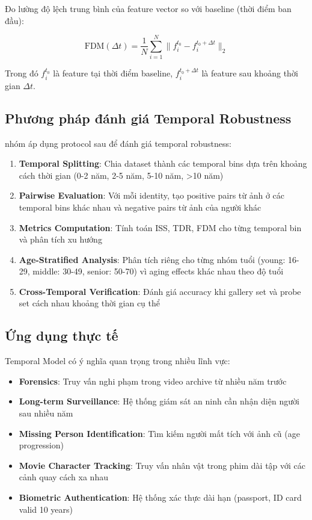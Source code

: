 Đo lường độ lệch trung bình của feature vector so với baseline (thời điểm ban đầu):

\begin{equation}
\text{FDM}(\Delta t) = \frac{1}{N} \sum_{i=1}^{N} \|f_i^{t_0} - f_i^{t_0 + \Delta t}\|_2
\end{equation}

Trong đó $f_i^{t_0}$ là feature tại thời điểm baseline, $f_i^{t_0 + \Delta t}$ là feature sau khoảng thời gian $\Delta t$.

\subsection{Phương pháp đánh giá Temporal Robustness}

nhóm áp dụng protocol sau để đánh giá temporal robustness:

\begin{enumerate}
    \item \textbf{Temporal Splitting}: Chia dataset thành các temporal bins dựa trên khoảng cách thời gian (0-2 năm, 2-5 năm, 5-10 năm, >10 năm)
    
    \item \textbf{Pairwise Evaluation}: Với mỗi identity, tạo positive pairs từ ảnh ở các temporal bins khác nhau và negative pairs từ ảnh của người khác
    
    \item \textbf{Metrics Computation}: Tính toán ISS, TDR, FDM cho từng temporal bin và phân tích xu hướng
    
    \item \textbf{Age-Stratified Analysis}: Phân tích riêng cho từng nhóm tuổi (young: 16-29, middle: 30-49, senior: 50-70) vì aging effects khác nhau theo độ tuổi
    
    \item \textbf{Cross-Temporal Verification}: Đánh giá accuracy khi gallery set và probe set cách nhau khoảng thời gian cụ thể
\end{enumerate}

\subsection{Ứng dụng thực tế}

Temporal Model có ý nghĩa quan trọng trong nhiều lĩnh vực:

\begin{itemize}
    \item \textbf{Forensics}: Truy vấn nghi phạm trong video archive từ nhiều năm trước
    \item \textbf{Long-term Surveillance}: Hệ thống giám sát an ninh cần nhận diện người sau nhiều năm
    \item \textbf{Missing Person Identification}: Tìm kiếm người mất tích với ảnh cũ (age progression)
    \item \textbf{Movie Character Tracking}: Truy vấn nhân vật trong phim dài tập với các cảnh quay cách xa nhau
    \item \textbf{Biometric Authentication}: Hệ thống xác thực dài hạn (passport, ID card valid 10 years)
\end{itemize}
